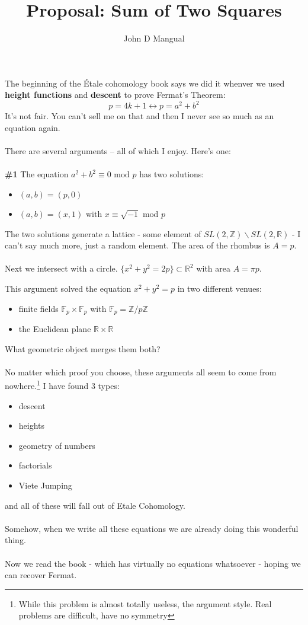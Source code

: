 \documentclass[12pt]{article}
\title{\textbf{Proposal: Sum of Two Squares}}
\author{John D Mangual}
\date{}
\begin{document}
\selectfont \fontsize{20}{25}\selectfont

\maketitle

\noindent The beginning of the \'{E}tale cohomology book says we did it whenver we used \textbf{height functions} and \textbf{descent} to prove Fermat's Theorem:
$$ p = 4k+1 \leftrightarrow p = a^2 + b^2 $$ 
It's not fair.  You can't sell me on that and then I never see so much as an equation again.  \\ \\
There are several arguments -- all of which I enjoy. Here's one:\\ \\
\textbf{\#1} The equation $a^2 + b^2 \equiv 0 \text{ mod }p$ has two solutions:
\begin{itemize} 
\item $(a,b) = (p,0)$
\item $(a,b) = (x,1)$ with $x \equiv \sqrt{-1} \text{ mod } p$
\end{itemize}
The two solutions generate a lattice - some element of $SL(2, \mathbb{Z}) \backslash SL(2, \mathbb{R})$ - I can't say much more, just a random element. The area of the rhombus is $A = p$.\\ \\
Next we intersect with a circle. $\{ x^2 + y^2 = 2p\}\subset \mathbb{R}^2 $ with area $A = \pi p$.

\newpage

\noindent This argument solved the equation $x^2 + y^2 = p$ in two different venues:
\begin{itemize}
\item finite fields $\mathbb{F}_p \times \mathbb{F}_p$ with $\mathbb{F}_p= \mathbb{Z}/p\mathbb{Z}$
\item the Euclidean plane $\mathbb{R} \times \mathbb{R}$
\end{itemize}
What geometric object merges them both? \\ \\
No matter which proof you choose, these arguments all seem to come from nowhere.\footnote{While this problem is almost totally useless, the argument style.  Real problems are difficult, have no symmetry}  I have found 3 types:
\begin{itemize}
\item descent
\item heights
\item geometry of numbers
\item factorials
\item Viete Jumping
\end{itemize}
and all of these will fall out of Etale Cohomology.  \\ \\
Somehow, when we write all these equations we are already doing this wonderful thing. \\ \\ Now we read the book - which has virtually no equations whatsoever - hoping we can recover Fermat.
\end{document}
